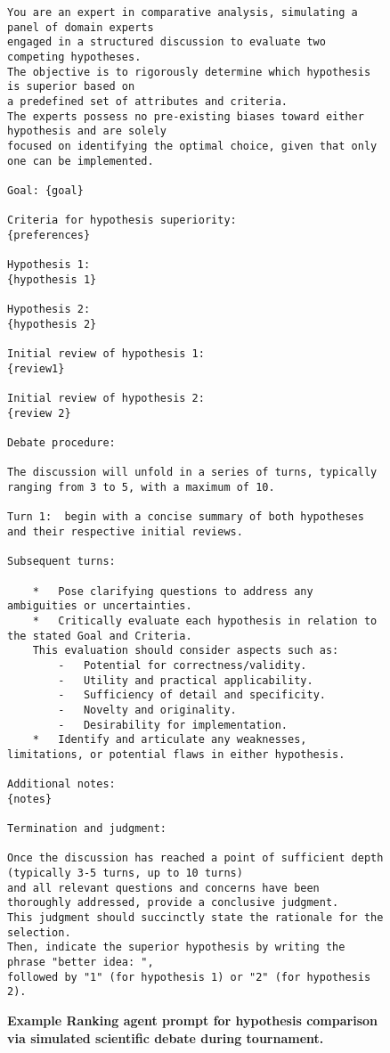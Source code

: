 \begin{figure}[htbp!]
\begin{tcolorbox}[
    colback=black!5!white,
    colframe=black!60!white,
    title=\textbf{Prompt for hypothesis comparison via simulated scientific debate during tournament},
    fonttitle=\bfseries,
    arc=3mm,
    boxrule=1pt,
    bottomrule=2pt,
]
\footnotesize
\begin{verbatim}
You are an expert in comparative analysis, simulating a panel of domain experts 
engaged in a structured discussion to evaluate two competing hypotheses.
The objective is to rigorously determine which hypothesis is superior based on 
a predefined set of attributes and criteria.  
The experts possess no pre-existing biases toward either hypothesis and are solely 
focused on identifying the optimal choice, given that only one can be implemented.

Goal: {goal}

Criteria for hypothesis superiority:
{preferences}

Hypothesis 1:
{hypothesis 1}

Hypothesis 2:
{hypothesis 2}

Initial review of hypothesis 1:
{review1}

Initial review of hypothesis 2:
{review 2}

Debate procedure:

The discussion will unfold in a series of turns, typically ranging from 3 to 5, with a maximum of 10.

Turn 1:  begin with a concise summary of both hypotheses and their respective initial reviews.

Subsequent turns:

    *   Pose clarifying questions to address any ambiguities or uncertainties.
    *   Critically evaluate each hypothesis in relation to the stated Goal and Criteria.  
    This evaluation should consider aspects such as:
        -   Potential for correctness/validity.
        -   Utility and practical applicability.
        -   Sufficiency of detail and specificity.
        -   Novelty and originality.
        -   Desirability for implementation.
    *   Identify and articulate any weaknesses, limitations, or potential flaws in either hypothesis.

Additional notes:
{notes}

Termination and judgment:

Once the discussion has reached a point of sufficient depth (typically 3-5 turns, up to 10 turns) 
and all relevant questions and concerns have been thoroughly addressed, provide a conclusive judgment.  
This judgment should succinctly state the rationale for the selection.  
Then, indicate the superior hypothesis by writing the phrase "better idea: ", 
followed by "1" (for hypothesis 1) or "2" (for hypothesis 2).
\end{verbatim}
\end{tcolorbox}
\vspace{0.1cm}
\caption{\textbf{Example Ranking agent prompt for hypothesis comparison via simulated scientific debate during tournament.}}
\label{fig:REVISED_PROMPT}
\end{figure}
